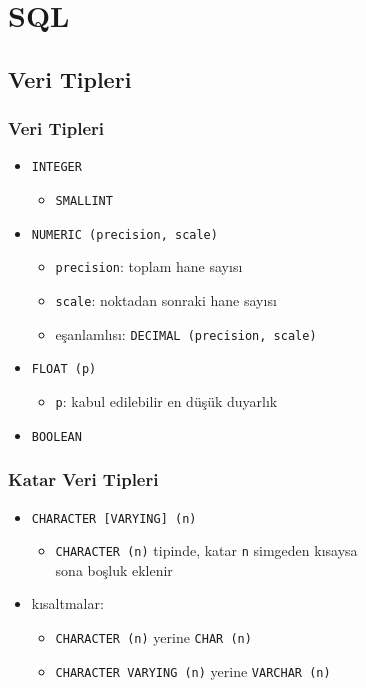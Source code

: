 \documentclass[dvipsnames]{beamer}
\theoremstyle{definition}
\theoremstyle{example}
\theoremstyle{plain}
\begin{document}
\lstset{language=FullSQL}

\section{SQL}

\subsection{Veri Tipleri}

\begin{frame}
  \frametitle{Veri Tipleri}

  \begin{itemize}
    \item \texttt{INTEGER}
    \begin{itemize}
      \item \texttt{SMALLINT}
    \end{itemize}

    \pause
    \medskip
    \item \texttt{NUMERIC (precision, scale)}
    \begin{itemize}
      \item \texttt{precision}: toplam hane sayısı
      \item \texttt{scale}: noktadan sonraki hane sayısı
      \item eşanlamlısı: \texttt{DECIMAL (precision, scale)}
    \end{itemize}

    \pause
    \medskip
    \item \texttt{FLOAT (p)}
    \begin{itemize}
      \item \texttt{p}: kabul edilebilir en düşük duyarlık
    \end{itemize}

    \pause
    \medskip
    \item \texttt{BOOLEAN}
  \end{itemize}
\end{frame}

\begin{frame}
  \frametitle{Katar Veri Tipleri}

  \begin{itemize}
    \item \texttt{CHARACTER [VARYING] (n)}
    \begin{itemize}
      \item \texttt{CHARACTER (n)} tipinde, katar \texttt{n} simgeden kısaysa\\
        sona boşluk eklenir
    \end{itemize}

    \pause
    \item kısaltmalar:
    \begin{itemize}
      \item \texttt{CHARACTER (n)} yerine \texttt{CHAR (n)}
      \item \texttt{CHARACTER VARYING (n)} yerine \texttt{VARCHAR (n)}
    \end{itemize}
  \end{itemize}
\end{frame}
\end{document}
